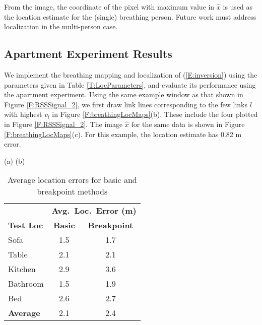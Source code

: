 \documentclass[10pt,journal,letterpaper]{IEEEtran}
\begin{document}
From the image, the coordinate of the pixel with maximum value in $\hat{x}$ is used as the location estimate for the (single) breathing person.  Future work must address localization in the multi-person case.


\subsection{Apartment Experiment Results}

We implement the breathing mapping and localization of (\ref{E:inversion}) using the parameters given in Table \ref{T:LocParameters}, and evaluate its performance using the apartment experiment.  Using the same example window as that shown in Figure \ref{F:RSSSignal_2}, we first draw link lines corresponding to the few links $l$ with highest $v_l$ in Figure \ref{F:breathingLocMaps}(b).  These include the four plotted in Figure \ref{F:RSSSignal_2}. 
The image $\hat{x}$ for the same data is shown in Figure \ref{F:breathingLocMaps}(c).  For this example, the location estimate has 0.82 m error.  


\begin{figure*}[bth]
\centerline{ 
             (a)  
             (b) }
\caption{(a) lines for the top ten links by $v_l$, and (d) breathing image $\hat{x}$ (white=high), with true ($\boldsymbol{\times}$) and estimated (\textcolor{red}{$\boldsymbol{+}$}) locations.}
    \label{F:breathingLocMaps}
\end{figure*}

\begin{table}[tbp]
\centering
\begin{tabular}{|l|cc|}
\hline
\bf          & \multicolumn{2}{c|}{\bf Avg.~Loc.~Error (m)} \\
\bf Test Loc &  \bf Basic & \bf Breakpoint \\
\hline
 Sofa       & 1.5 & 1.7 \\ Table      & 2.1 & 2.1 \\ Kitchen    & 2.9 & 3.6 \\
 Bathroom   & 1.5 & 1.9 \\
 Bed        & 2.6 & 2.7 \\
\hline
\bf Average & 2.1 & 2.4\\ \hline
\end{tabular}
\caption{Average location errors for basic and breakpoint methods} \label{T:LocResults}
\end{table}
\end{document}
